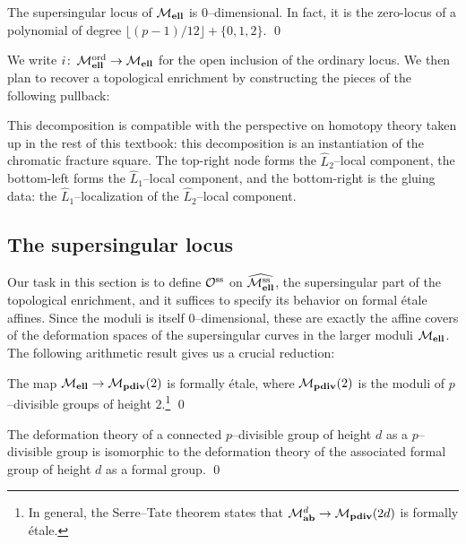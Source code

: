 \begin{lemma}
The supersingular locus of $\mathcal{M}_{\mathbf{ell}}$ is $0$--dimensional.  In fact, it is the zero-locus of a polynomial of degree $\lfloor (p-1)/12 \rfloor + \{0, 1, 2\}$. \qed
\end{lemma}

\noindent We write $i\colon\thinspace \mathcal{M}_{\mathbf{ell}}^{\mathrm{ord}} \to \mathcal{M}_{\mathbf{ell}}$ for the open inclusion of the ordinary locus.  We then plan to recover a topological enrichment by constructing the pieces of the following pullback:
\begin{center}
\end{center}
This decomposition is compatible with the perspective on homotopy theory taken up in the rest of this textbook: this decomposition is an instantiation of the chromatic fracture square.  The top-right node forms the $\widehat L_2$--local component, the bottom-left forms the $\widehat L_1$--local component, and the bottom-right is the gluing data: the $\widehat L_1$--localization of the $\widehat L_2$--local component.






\subsection*{The supersingular locus}

Our task in this section is to define $\mathcal{O}^{\mathrm{ss}}$ on $\widehat{\mathcal{M}_{\mathbf{ell}}^{\mathrm{ss}}}$, the supersingular part of the topological enrichment, and it suffices to specify its behavior on formal \'etale affines.  Since the moduli is itself $0$--dimensional, these are exactly the affine covers of the deformation spaces of the supersingular curves in the larger moduli $\mathcal{M}_{\mathbf{ell}}$.  The following arithmetic result gives us a crucial reduction:

\begin{theorem}
The map $\mathcal{M}_{\mathbf{ell}} \to \mathcal{M}_{\mathbf{pdiv}}(2)$ is formally \'etale, where $\mathcal{M}_{\mathbf{pdiv}}(2)$ is the moduli of $p$--divisible groups of height $2$.\footnote{In general, the Serre--Tate theorem states that $\mathcal{M}_{\mathbf{ab}}^{d} \to \mathcal{M}_{\mathbf{pdiv}}(2d)$ is formally \'etale.} \qed
\end{theorem}
\begin{lemma}
The deformation theory of a connected $p$--divisible group of height $d$ as a $p$--divisible group is isomorphic to the deformation theory of the associated formal group of height $d$ as a formal group. \qed
\end{lemma}

